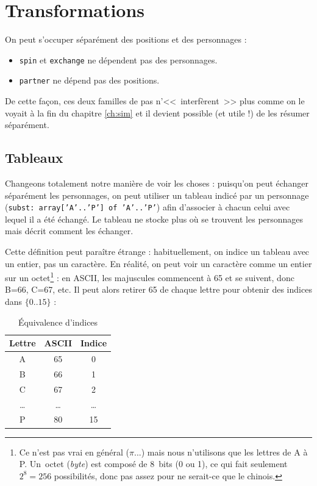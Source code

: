 \documentclass[11pt,a4paper,oneside]{book}
\begin{document}

\section{Transformations}
On peut s'occuper séparément des positions et des personnages :
\begin{itemize}
	\item \texttt{spin} et \texttt{exchange} ne dépendent pas des personnages.
	\item \texttt{partner} ne dépend pas des positions.
\end{itemize}

De cette façon, ces deux familles de pas n'<<~interfèrent~>> plus comme on le
voyait à la fin du chapitre \ref{ch:sim} et
il devient possible (et utile !) de les résumer séparément.


\subsection{Tableaux}
Changeons totalement notre manière de voir les choses : puisqu'on peut échanger
séparément les personnages, on peut utiliser un tableau indicé
par un personnage (\texttt{subst: array['A'..'P'] of 'A'..'P'}) afin d'associer
à chacun celui avec lequel il a été échangé.
Le tableau ne stocke plus où se trouvent les personnages mais décrit
comment les échanger.

Cette définition peut paraître étrange : habituellement, on indice un tableau
avec un entier, pas un caractère. En réalité, on peut voir un caractère
comme un entier sur un octet\footnote{Ce n'est pas vrai en général ($\pi$...)
mais nous n'utilisons que les lettres de A à P. Un~octet (\emph{byte}) est
composé de 8~bits (0 ou 1), ce qui fait seulement $2^8=256$ possibilités, donc
pas assez pour ne serait-ce que le chinois.} : en ASCII,
les majuscules commencent à 65 et se suivent, donc B=66, C=67, etc. Il peut
alors retirer 65 de chaque lettre pour obtenir des indices dans $\{0..15\}$ :

\begin{table}[h]
\center
\begin{tabular}{c|c|c}
Lettre & ASCII & Indice \\ \hline\hline
A & 65 & 0 \\ \hline
B & 66 & 1 \\ \hline
C & 67 & 2 \\ \hline
\dots & \dots & \dots \\ \hline
P & 80 & 15
\end{tabular}
\caption{Équivalence d'indices}
\end{table}
\end{document}
